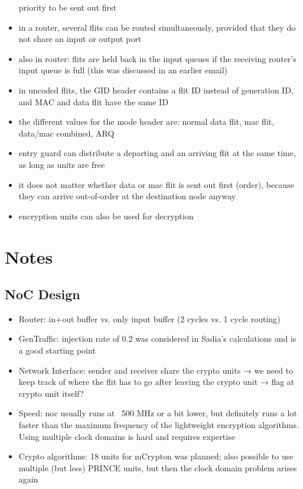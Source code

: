 \documentclass[
	paper=a4,
	fontsize=11pt,
	parskip=full %
]{scrreprt}
\begin{document}
\begin{itemize}
            priority to be sent out first
        \item in a router, several flits can be routed simultaneously, provided that
            they do not share an input or output port
        \item also in router: flits are held back in the input queues if the
            receiving router's input queue is full (this was discussed in an earlier
            email)
        \item in uncoded flits, the GID header contains a flit ID instead of
            generation ID, and MAC and data flit have the same ID
        \item the different values for the mode header are: normal data flit, mac
            flit, data/mac combined, ARQ
        \item entry guard can distribute a departing and an arriving flit at the same
            time, as long as units are free
        \item it does not matter whether data or mac flit is sent out first (order),
            because they can arrive out-of-order at the destination node anyway
        \item encryption units can also be used for decryption
    \end{itemize}

    \chapter{Notes}
    \section{NoC Design}
    \begin{itemize}
        \item Router: in+out buffer vs. only input buffer (2 cycles vs. 1 cycle routing)
        \item GenTraffic: injection rate of 0.2 was considered in Sadia's calculations and is a good starting point
        \item Network Interface: sender and receiver share the crypto units → we need to keep track of where the flit has to go after leaving the crypto unit → flag at crypto unit itself?
        \item Speed: \gls{noc} usually runs at ~500 MHz or a bit lower, but definitely runs a lot faster than the maximum frequency of the lightweight encryption algorithms. Using multiple clock domains is hard and requires expertise
        \item Crypto algorithms: 18 units for mCrypton was planned; also possible to use multiple (but less) PRINCE units, but then the clock domain problem arises again
    \end{itemize}

    \printglossaries
	
    \printbibliography[heading=bibintoc]
\end{document}
